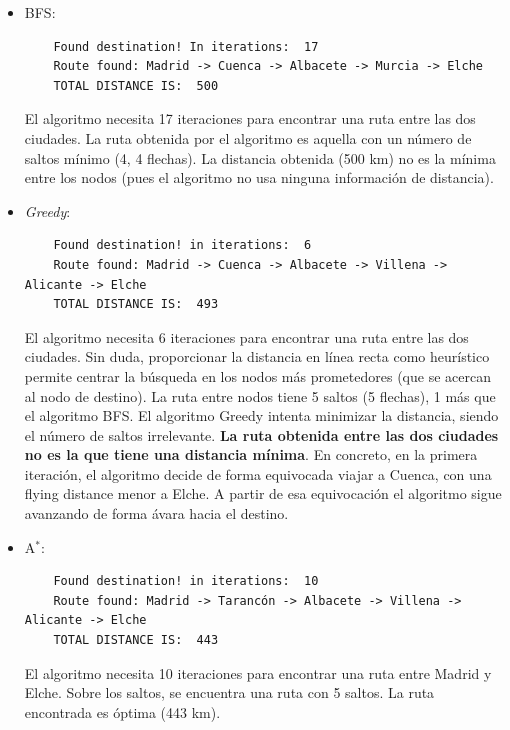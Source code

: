 \documentclass{article}
\begin{document}
\begin{itemize}
    \item BFS: 
    \begin{verbatim}
    Found destination! In iterations:  17
    Route found: Madrid -> Cuenca -> Albacete -> Murcia -> Elche
    TOTAL DISTANCE IS:  500
    \end{verbatim}
    El algoritmo necesita 17 iteraciones para encontrar una ruta entre las dos ciudades. La ruta obtenida por el algoritmo es aquella con un número de saltos mínimo (4, 4 flechas). La distancia obtenida (500 km) no es la mínima entre los nodos (pues el algoritmo no usa ninguna información de distancia).

    \item \textit{Greedy}:
    \begin{verbatim}
    Found destination! in iterations:  6
    Route found: Madrid -> Cuenca -> Albacete -> Villena -> Alicante -> Elche
    TOTAL DISTANCE IS:  493
    \end{verbatim}  
    El algoritmo necesita 6 iteraciones para encontrar una ruta entre las dos ciudades. Sin duda, proporcionar la distancia en línea recta como heurístico permite centrar la búsqueda en los nodos más prometedores (que se acercan al nodo de destino). La ruta entre nodos tiene 5 saltos (5 flechas), 1 más que el algoritmo BFS. El algoritmo Greedy intenta minimizar la distancia, siendo el número de saltos irrelevante. \textbf{La ruta obtenida entre las dos ciudades no es la que tiene una distancia mínima}. En concreto, en la primera iteración, el algoritmo decide de forma equivocada viajar a Cuenca, con una flying distance menor a Elche. A partir de esa equivocación el algoritmo sigue avanzando de forma ávara hacia el destino.

    \item A$^*$:
    \begin{verbatim}
    Found destination! in iterations:  10
    Route found: Madrid -> Tarancón -> Albacete -> Villena -> Alicante -> Elche
    TOTAL DISTANCE IS:  443
    \end{verbatim}
    El algoritmo necesita 10 iteraciones para encontrar una ruta entre Madrid y Elche. Sobre los saltos, se encuentra una ruta con 5 saltos. La ruta encontrada es óptima (443 km).
    
        
    


\end{itemize}
\end{document}
